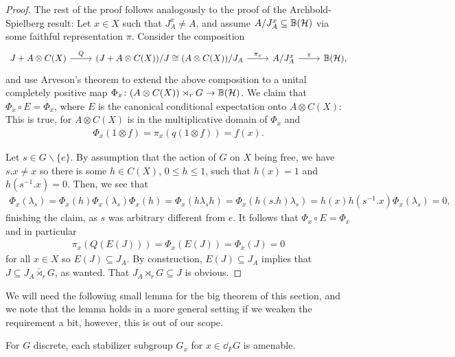 \begin{proof}
	The rest of the proof follows analogously to the proof of the Archbold-Spielberg result: Let $x \in X$ such that $J_A^x \neq A$, and assume $A/J_A^x \subseteq \mathbb{B}(\mathcal{H})$ via some faithful representation $\pi$. Consider the composition
	\begin{equation}
		\begin{tikzcd}
			J + A \otimes C(X) \ar[r, "Q"] & (J+ A \otimes C(X))/J \cong  (A \otimes C(X))/J_A \ar[r, "\pi_x"] & A/J_A^x \ar[r, "\pi"] &\mathbb{B}(\H),
		\end{tikzcd}
	\end{equation}
	 and use Arveson's theorem to extend the above composition to a unital completely positive map $\Phi_x \colon (A \otimes C(X)) \rtimes_r G \to \mathbb{B}(\mathcal{H})$. We claim that $\Phi_x \circ E = \Phi_x$, where $E$ is the canonical conditional expectation onto $A \otimes C(X)$: This is true, for $A \otimes C(X)$ is in the multiplicative domain of $\Phi_x$ and 
	\begin{align*}
		\Phi_x(1 \otimes f) = \pi_x(q(1 \otimes f)) = f(x).
	\end{align*}
	
	Let $s \in G\backslash\{e\}$. By assumption that the action of $G$ on $X$ being free, we have $s.x\neq x$ so there is some $h \in C(X)$, $ 0 \leq h \leq 1$, such that $h(x) = 1$ and $h(s^{-1}.x) = 0$. Then, we see that
	\begin{align*}
		\Phi_x( \lambda_s) = \Phi_x(h) \Phi_x(\lambda_s) \Phi_x(h) = \Phi_x ( h \lambda_s h ) = \Phi_x (h (s.h) \lambda_s) = h(x)h(s^{-1}.x) \Phi_x(\lambda_s) = 0,		
	\end{align*}
	finishing the claim, as $s$ was arbitrary different from $e$. It follows that $\Phi_x \circ E = \Phi_x$ and in particular 
	\begin{align*}
		\pi_x(Q(E(J))) = \Phi_x(E(J)) = \Phi_x(J) = 0	
	\end{align*}
	for all $x \in X$ so $E(J) \subseteq J_A$. By construction, $E(J) \subseteq J_A$ implies that $J \subseteq J_A \bar \rtimes_r G$, as wanted. That $J_A \rtimes_r G \subseteq J$ is obvious.
\end{proof}
We will need the following small lemma for the big theorem of this section, and we note that the lemma holds in a more general setting if we weaken the requirement a bit, however, this is out of our scope.
\begin{lemma}
	For $G$ discrete, each stabilizer subgroup $G_x$ for $x \in \dd_F G$ is amenable.
	\label{stabfurstamen}
\end{lemma}
